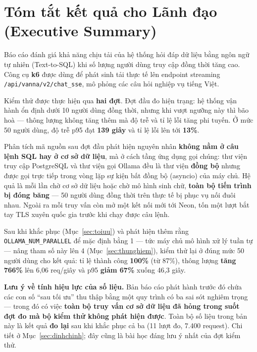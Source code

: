 \documentclass[12pt,a4paper]{article}
\newcommand{\ok}[1]{\textcolor{successgreen}{\bfseries #1}}
\newcommand{\bad}[1]{\textcolor{dangerred}{\bfseries #1}}
\begin{document}
\setcounter{page}{1}
\setcounter{tocdepth}{1}
\tableofcontents
\clearpage

\section{Tóm tắt kết quả cho Lãnh đạo (Executive Summary)}

Báo cáo đánh giá khả năng chịu tải của hệ thống hỏi đáp dữ liệu bằng ngôn ngữ
tự nhiên (Text-to-SQL) khi số lượng người dùng truy cập đồng thời tăng cao.
Công cụ \textbf{k6} được dùng để phát sinh tải thực tế lên endpoint streaming
\texttt{/api/vanna/v2/chat\_sse}, mô phỏng các câu hỏi nghiệp vụ tiếng Việt.

Kiểm thử được thực hiện qua \textbf{hai đợt}. Đợt đầu đo hiện trạng: hệ thống vận
hành ổn định dưới 10 người dùng đồng thời, nhưng khi vượt ngưỡng này thì bão hoà
--- thông lượng không tăng thêm mà độ trễ và tỉ lệ lỗi tăng phi tuyến. Ở mức 50
người dùng, độ trễ p95 đạt \bad{139 giây} và tỉ lệ lỗi lên tới \bad{13\%}.

Phân tích mã nguồn sau đợt đầu phát hiện nguyên nhân \textbf{không nằm ở câu lệnh
SQL hay ở cơ sở dữ liệu}, mà ở cách tầng ứng dụng gọi chúng: thư viện truy cập
PostgreSQL và thư viện gọi Ollama đều là thư viện \textbf{đồng bộ} nhưng được gọi
trực tiếp trong vòng lặp sự kiện bất đồng bộ (asyncio) của máy chủ. Hệ quả là mỗi
lần chờ cơ sở dữ liệu hoặc chờ mô hình sinh chữ, \textbf{toàn bộ tiến trình bị
đóng băng} --- 50 người dùng đồng thời trên thực tế bị phục vụ nối đuôi nhau.
Ngoài ra mỗi truy vấn còn mở một kết nối mới tới Neon, tốn một lượt bắt tay TLS
xuyên quốc gia trước khi chạy được câu lệnh.

Sau khi khắc phục (Mục~\ref{sec:toiuu}) và phát hiện thêm rằng
\texttt{OLLAMA\_NUM\_PARALLEL} để mặc định bằng 1 --- tức máy chủ mô hình xử lý
tuần tự --- nâng tham số này lên 4 (Mục~\ref{sec:thunghiem}), kiểm thử lại ở đúng
mức 50 người dùng cho kết quả: tỉ lệ thành công \ok{100\%} (từ 87\%), thông lượng
\ok{tăng 766\%} lên 6,06 req/giây và p95 \ok{giảm 67\%} xuống 46,3 giây.

\noindent\textbf{Lưu ý về tính hiệu lực của số liệu.} Bản báo cáo phát hành trước
đó chứa các con số ``sau tối ưu'' thu thập bằng một quy trình có ba sai sót
nghiêm trọng --- trong đó có việc \textbf{toàn bộ truy vấn cơ sở dữ liệu đã hỏng
trong suốt đợt đo mà bộ kiểm thử không phát hiện được}. Toàn bộ số liệu trong bản
này là kết quả \textbf{đo lại} sau khi khắc phục cả ba (11 lượt đo, 7.400
request). Chi tiết ở Mục~\ref{sec:dinhchinh}; đây cũng là bài học đáng lưu ý nhất
của đợt kiểm thử.
\end{document}

